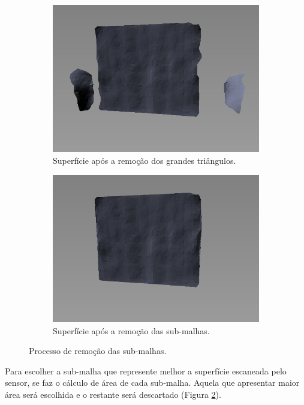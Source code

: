 \begin{figure}[H]
\begin{subfigure}[t]{0.4\textwidth}
        \includegraphics[width=\textwidth]{dados/figuras/split_mesh3.png}
        \caption{Superfície após a remoção dos grandes triângulos.}
        \label{fig:split_mesh3}
    \end{subfigure}
    \begin{subfigure}[t]{0.4\textwidth}
        \includegraphics[width=\textwidth]{dados/figuras/split_mesh4.png}
        \caption{Superfície após a remoção das sub-malhas.}
        \label{fig:split_mesh4}
    \end{subfigure}
    \caption{Processo de remoção das sub-malhas.}
    \label{fig:split_mesh}
\end{figure}

Para escolher a sub-malha que represente melhor a superfície escaneada pelo sensor, se faz o cálculo de área de cada sub-malha.
Aquela que apresentar maior área será escolhida e o restante será descartado (Figura \ref{fig:split_mesh4}).



